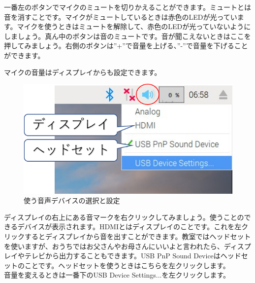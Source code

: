 一番左のボタンでマイクのミュートを切りかえることができます。ミュートとは音を消すことです。マイクがミュートしているときは赤色のLEDが光っています。マイクを使うときはミュートを解除して、赤色のLEDが光っていないようにしましょう。真ん中のボタンは音のミュートです。音が聞こえないときはここを押してみましょう。右側のボタンは”+”で音量を上げる、”-”で音量を下げることができます。

マイクの音量はディスプレイからも設定できます。

\begin{figure}[H]
\begin{center}
    \includegraphics[width=\linewidth]{images/chap06/text06-img005.png}
    \caption{使う音声デバイスの選択と設定}
    \label{使う音声デバイスの選択と設定}
\end{center}
\end{figure}

ディスプレイの右上にある音マークを右クリックしてみましょう。使うことのできるデバイスが表示されます。HDMIとはディスプレイのことです。これを左クリックするとディスプレイから音を出すことができます。教室ではヘッドセットを使いますが、おうちではお父さんやお母さんにいいよと言われたら、ディスプレイやテレビから出力することもできます。USB PnP Sound Deviceはヘッドセットのことです。ヘッドセットを使うときはこちらを左クリックします。\\

音量を変えるときは一番下のUSB Device Settings...を左クリックします。


